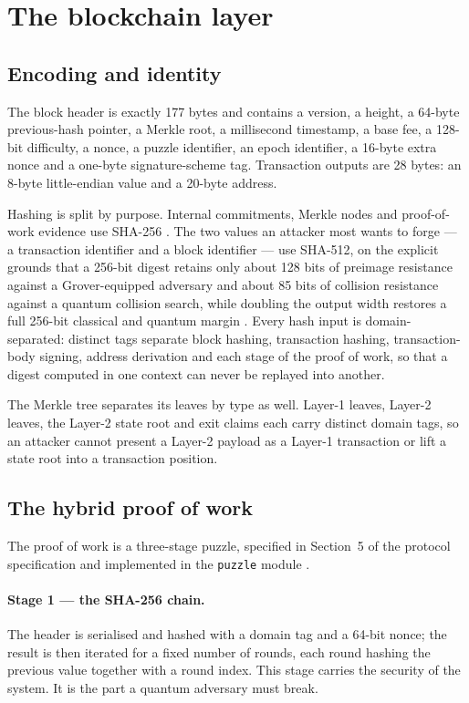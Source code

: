 \documentclass{article}
\begin{document}
\section{The blockchain layer}
\label{sec:l1}

\subsection{Encoding and identity}

The block header is exactly 177 bytes and contains a version, a height, a
64-byte previous-hash pointer, a Merkle root, a millisecond timestamp, a base
fee, a 128-bit difficulty, a nonce, a puzzle identifier, an epoch identifier, a
16-byte extra nonce and a one-byte signature-scheme tag. Transaction outputs
are 28 bytes: an 8-byte little-endian value and a 20-byte address.

Hashing is split by purpose. Internal commitments, Merkle nodes and proof-of-work
evidence use SHA-256 \cite{nist-fips180-4}. The two values an attacker most
wants to forge --- a transaction identifier and a block identifier --- use
SHA-512, on the explicit grounds that a 256-bit digest retains only about 128
bits of preimage resistance against a Grover-equipped adversary and about 85
bits of collision resistance against a quantum collision search, while doubling
the output width restores a full 256-bit classical and quantum margin
\cite{shor1994algorithms,grover1996fast}. Every hash input is domain-separated:
distinct tags separate block hashing, transaction hashing, transaction-body
signing, address derivation and each stage of the proof of work, so that a
digest computed in one context can never be replayed into another.

The Merkle tree separates its leaves by type as well. Layer-1 leaves, Layer-2
leaves, the Layer-2 state root and exit claims each carry distinct domain
tags, so an attacker cannot present a Layer-2 payload as a Layer-1 transaction
or lift a state root into a transaction position.

\subsection{The hybrid proof of work}
\label{sec:pow}

The proof of work is a three-stage puzzle, specified in
Section~5 of the protocol specification and implemented in the \texttt{puzzle}
module \cite{jounit-spec}.

\paragraph{Stage 1 --- the SHA-256 chain.} The header is serialised and hashed
with a domain tag and a 64-bit nonce; the result is then iterated for a fixed
number of rounds, each round hashing the previous value together with a
round index. This stage carries the security of the system. It is the part a
quantum adversary must break.
\end{document}
